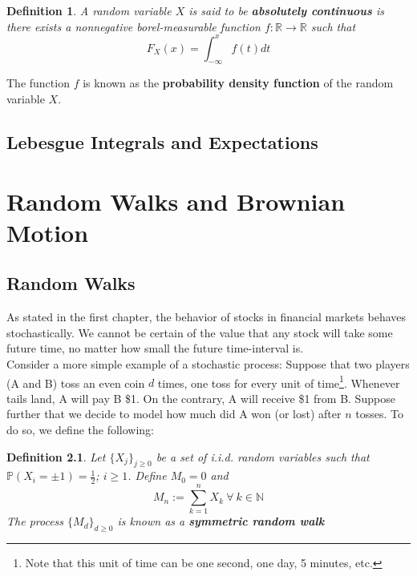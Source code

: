\documentclass[11pt]{report}
\newtheorem{definition}{Definition}[chapter]
\begin{document}
\begin{definition}
	A random variable $X$ is said to be \textbf{absolutely continuous} is there exists a nonnegative borel-measurable function $f: \mathbb{R}\rightarrow\mathbb{R}$ such that 
	\begin{equation}
		F_X(x) = \int_{-\infty}^{x} f(t) dt
	\end{equation}
\end{definition}

The function $f$ is known as the \textbf{probability density function} of the random variable $X$.

\section{Lebesgue Integrals and Expectations}


\chapter{Random Walks and Brownian Motion}

\section{Random Walks}
As stated in the first chapter, the behavior of stocks in financial markets behaves stochastically. We cannot be certain of the value that any stock will take some future time, no matter how small the future time-interval is.\\

Consider a more simple example of a stochastic process: Suppose that two players (A and B) toss an even coin $d$ times, one toss for every unit of time\footnote{Note that this unit of time can be one second, one day, 5 minutes, etc.}. Whenever tails land, A will pay B \$1. On the contrary, A will receive \$1 from B. Suppose further that we decide to model how much did A won (or lost) after $n$ tosses. To do so, we define the following:

\begin{definition}\label{srwalk}
	Let $\{X_j\}_{j\geq0}$ be a set of i.i.d. random variables such that $\mathbb{P}(X_i = \pm 1) = \frac{1}{2}$; $i \geq 1$. Define $M_0 = 0$ and
	\[M_n := \sum_{k=1}^n X_k \ \forall \ k \in \mathbb{N}\] 
	The process $\{M_d\}_{d\geq 0}$ is known as a \textbf{symmetric random walk}
\end{definition}
\end{document}
